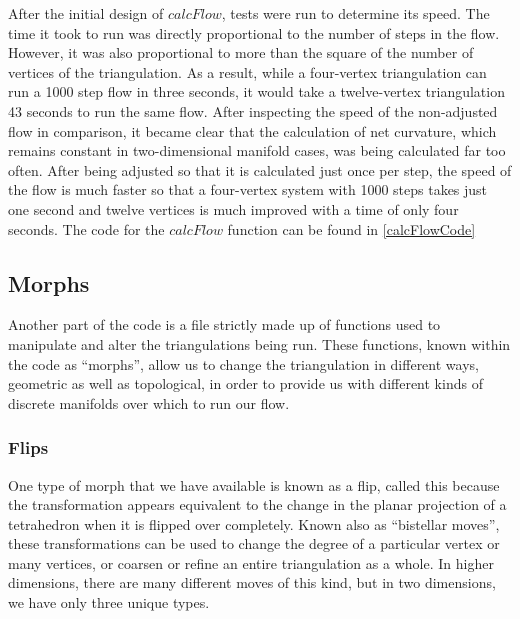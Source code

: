 \documentclass[12pt]{article}
\begin{document}
\noindent After the initial design of $calcFlow$, tests were run to determine its speed. The time it took to run was directly proportional to the number of steps in the flow. However, it was also proportional to more than the square of the number of vertices of the triangulation. As a result, while a four-vertex triangulation can run a 1000 step flow in three seconds, it would take a twelve-vertex triangulation 43 seconds to run the same flow. After inspecting the speed of the non-adjusted flow in comparison, it became clear that the calculation of net curvature, which remains constant in two-dimensional manifold cases, was being calculated far too often. After being adjusted so that it is calculated just once per step, the speed of the flow is much faster so that a four-vertex system with 1000 steps takes just one second and twelve vertices is much improved with a time of only four seconds. The code for the $calcFlow$ function can be found in \ref{calcFlowCode}

\subsection{Morphs}

Another part of the code is a file strictly made up of functions used to manipulate and alter the triangulations being run. These functions, known within the code as ``morphs'', allow us to change the triangulation in different ways, geometric as well as topological, in order to provide us with different kinds of discrete manifolds over which to run our flow.

\subsubsection{Flips}

One type of morph that we have available is known as a flip, called this because the transformation appears equivalent to the change in the planar projection of a tetrahedron when it is flipped over completely. Known also as ``bistellar moves'', these transformations can be used to change the degree of a particular vertex or many vertices, or coarsen or refine an entire triangulation as a whole. In higher dimensions, there are many different moves of this kind, but in two dimensions, we have only three unique types.
\end{document}
